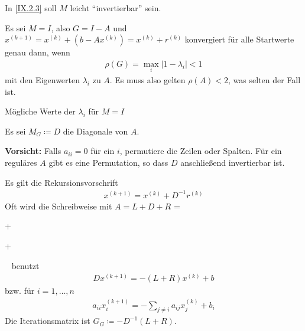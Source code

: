 
In \eqref{IX.2.3} soll $M$ leicht \enquote{invertierbar} sein.

Es sei $M=I$, also $G=I-A$ und
$x^{(k+1)}=x^{(k)}+(b-Ax^{(k)})=x^{(k)}+r^{(k)}$
konvergiert für alle Startwerte genau dann, wenn
\begin{gather}
  \rho(G) = \max_i\left| 1-\lambda_i \right|<1
\label{IX.3.1}
\end{gather}
mit den Eigenwerten $\lambda_i$ zu $A$.
Es muss also gelten $\rho(A) <2$, was selten der Fall ist.

\begin{image}{Mögliche Werte der $\lambda_i$ für $M=I$}
\end{image}

Es sei $M_G\coloneqq D$ die Diagonale von $A$.

\textbf{Vorsicht:} Falls $a_{ii}=0$ für ein $i$, 
permutiere die Zeilen oder Spalten.
Für ein reguläres $A$ gibt es eine Permutation,
so dass  $D$ anschließend invertierbar ist.

Es gilt die Rekursionsvorschrift
\begin{gather}
  x^{(k+1)}=x^{(k)}+D^{-1}r^{(k)}
\label{IX.3.2}
\end{gather}
Oft wird die Schreibweise mit $A=L+D+R$ =
+
+
~
benutzt
\begin{gather}
  Dx^{(k+1)}= -(L+R)x^{(k)}+b
\label{IX.3.3}
\end{gather}
bzw. für $i=1,\ldots,n$
\begin{gather}
  a_{ii}x_i^{(k+1)} = -\sum_{j\neq i}a_{ij}x_j^{(k)}+b_i
\label{IX.3.4}
\end{gather}
Die Iterationsmatrix ist $G_G\coloneqq -D^{-1}(L+R)$.


